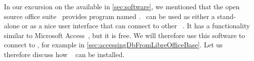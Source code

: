 %
%
\label{sec:installLibreOffice}%
%
In our excursion on the available  in \cref{sec:software}, we mentioned that the open source office suite \libreoffice\ provides program named \libreofficeBase.
\libreofficeBase\ can be used as either a stand-alone  or as a nice user interface that can connect to other ~\cite{FNFHWSKLSSGLFRSRPLJG2022BG7R1BOL7C,S2022L7PFEUU}.
It has a functionality similar to Microsoft Access~\cite{SSI2023MA2BTA,B2020HOMA2,UC2021AFD}, but it is free.
We will therefore use this software to connect to \postgresql, for example in \cref{sec:accessingDbFromLibreOfficeBase}.
Let us therefore discuss how \libreoffice~\cite{DF2024LTDF,GL2012LTSOOSSCBAFACSOL,S2022L7PFEUU} can be installed.%
%
%
%
%
\endhsection%
%
